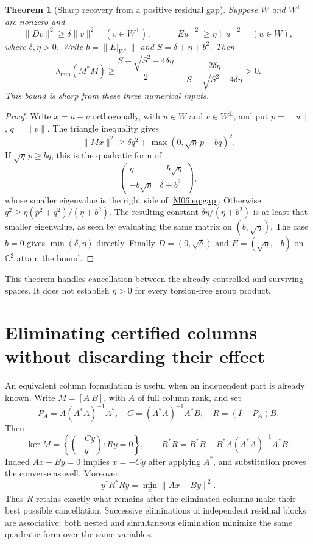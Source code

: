 \documentclass[11pt,a4paper,oneside]{report}
\newtheorem{theorem}{Theorem}[section]
\theoremstyle{definition}
\theoremstyle{remark}
\newcommand{\C}{\mathbb C}
\begin{document}
\begin{theorem}[Sharp recovery from a positive residual gap]\label{M06:thm:gap}
Suppose $W$ and $W^\perp$ are nonzero and
\[
\|Dv\|^2\ge\delta\|v\|^2\quad(v\in W^\perp),\qquad
\|Eu\|^2\ge\eta\|u\|^2\quad(u\in W),
\]
where $\delta,\eta>0$. Write $b=\|E|_{W^\perp}\|$ and
$S=\delta+\eta+b^2$. Then
\begin{equation}\label{M06:eq:gap}
\lambda_{\min}(M^*M)\ge
\frac{S-\sqrt{S^2-4\delta\eta}}2
=\frac{2\delta\eta}{S+\sqrt{S^2-4\delta\eta}}>0.
\end{equation}
This bound is sharp from these three numerical inputs.
\end{theorem}
\begin{proof}
Write $x=u+v$ orthogonally, with $u\in W$ and $v\in W^\perp$,
and put $p=\|u\|$, $q=\|v\|$. The triangle inequality gives
\[
\|Mx\|^2\ge\delta q^2+
\max(0,\sqrt\eta\,p-bq)^2.
\]
If $\sqrt\eta\,p\ge bq$, this is the quadratic form of
\[
\begin{pmatrix}\eta&-b\sqrt\eta\\-b\sqrt\eta&\delta+b^2\end{pmatrix},
\]
whose smaller eigenvalue is the right side of \eqref{M06:eq:gap}.
Otherwise $q^2\ge\eta(p^2+q^2)/(\eta+b^2)$. The resulting
constant $\delta\eta/(\eta+b^2)$ is at least that smaller
eigenvalue, as seen by evaluating the same matrix on
$(b,\sqrt\eta)$. The case $b=0$ gives $\min(\delta,\eta)$
directly. Finally $D=(0,\sqrt\delta)$ and $E=(\sqrt\eta,-b)$
on $\C^2$ attain the bound.
\end{proof}
This theorem handles cancellation between the already controlled
and surviving spaces. It does not establish $\eta>0$ for every
torsion-free group product.

\section{Eliminating certified columns without discarding their effect}

An equivalent column formulation is useful when an independent
part is already known. Write $M=[A\ B]$, with $A$ of full column
rank, and set
\[
P_A=A(A^*A)^{-1}A^*,\quad C=(A^*A)^{-1}A^*B,\quad R=(I-P_A)B.
\]
Then
\begin{equation}\label{M06:eq:schur}
\ker M=\left\{\binom{-Cy}{y}:Ry=0\right\},\qquad
R^*R=B^*B-B^*A(A^*A)^{-1}A^*B.
\end{equation}
Indeed $Ax+By=0$ implies $x=-Cy$ after applying $A^*$,
and substitution proves the converse as well. Moreover
\[
y^*R^*Ry=\min_x\|Ax+By\|^2.
\]
Thus $R$ retains exactly what remains after the eliminated
columns make their best possible cancellation. Successive
eliminations of independent residual blocks are associative: both nested and simultaneous
elimination minimize the same quadratic form over the same
variables.
\end{document}

